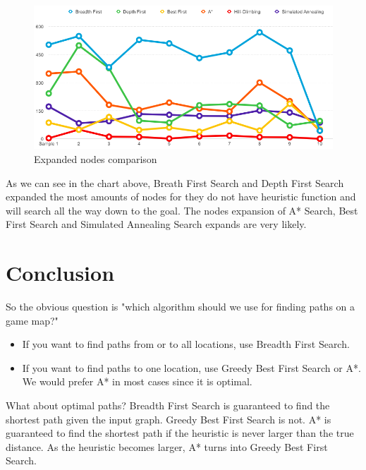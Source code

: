 \documentclass[a4paper]{article}
\begin{document}
\begin{figure}[h!]
  \centering
    \includegraphics[scale=.4]{images/expanded_node.png}
  \caption{Expanded nodes comparison}
\end{figure}

As we can see in the chart above, Breath First Search and Depth First Search expanded the most amounts of nodes for they do not have heuristic function and will search all the way down to the goal.  The nodes expansion of A* Search, Best First Search and Simulated Annealing Search expands are very likely. \\




\section{Conclusion}

So the obvious question is "which algorithm should we use for finding paths on a game map?"

\begin{itemize}
\item If you want to find paths from or to all locations, use Breadth First Search.
\item If you want to find paths to one location, use Greedy Best First Search or A*. We would prefer A* in most cases since it is optimal.
\end{itemize}

What about optimal paths? Breadth First Search is guaranteed to find the shortest path given the input graph. Greedy Best First Search is not. A* is guaranteed to find the shortest path if the heuristic is never larger than the true distance. As the heuristic becomes larger, A* turns into Greedy Best First Search.\\
\end{document}
